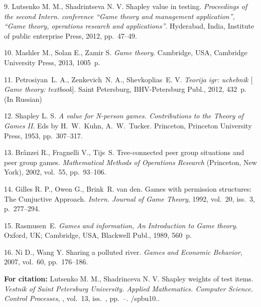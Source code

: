 {9. Lutsenko M. M., Shadrintseva N. V. Shapley value in testing.
{\it Proceedings of the second Intern. conference ``Game theory
and management application'', ``Game theory, operations research
and applications''}. Hyderabad, India, Institute of public
enterprise Press, 2012,  pp.~47--49.

10. Mashler M., Solan E., Zamir S.  {\it Game theory}. Cambridge,
USA, Cambridge University Press, 2013, 1005~p.

11. Petrosiyan~L. A., Zenkevich~N. A., Shevkoplias~E. V. {\it
Teorija igr: uchebnik $[$Game theory: textbook}]. Saint
Petersburg, BHV-Petersburg Publ., 2012, 432~p. (In Russian)

12. Shapley L. S. {\it A value for N-person games. Contributions
to the Theory of Games II}. Eds by H.~W.~Kuhn, A.~W.~Tucker.
Princeton, Princeton University Press, 1953,  pp.~307--317.

13. Br\^{a}nzei R., Fragnelli V., Tijs~S. Tree-connected peer
group situations and peer group games. {\it Mathematical Methods
of Operations Research} (Princeton, New York), 2002, vol.~55,
pp.~93--106.

14. Gilles R. P., Owen G., Brink~R. van den. Games with permission
structures: The Cunjuctive Approach. {\it Intern. Journal of Game
Theory}, 1992,  vol.~20, iss.~3,  p.~277--294.

15. Rasmusen~E. {\it Games and information, An Introduction to
Game theory}. Oxford, UK; Cambridge, USA, Blackwell Publ., 1989,
560~p.

16. Ni D.,  Wang Y. Sharing a polluted river. {\it Games and
Economic Behavior}, 2007,  vol.~60,  pp.~176--186.





\vskip 2mm

{\bf For citation:}   Lutsenko M. M., Shadrinceva N. V. Shapley
weights of test items. {\it Vestnik of Saint Petersburg
University. Applied Mathematics. Computer Science. Control
Processes}, \issueyear, vol.~13, iss.~\issuenum,
pp.~\pageref{p7}--\pageref{p7e}.
\doivyp/spbu10.\issueyear.


}
